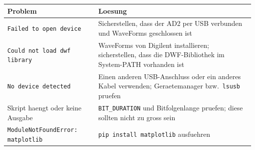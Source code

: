 \begin{center}
\begin{tabular}{p{}p{}}
\toprule
\textbf{Problem} & \textbf{Loesung} \\
\midrule
\texttt{Failed to open device} &
  Sicherstellen, dass der AD2 per USB verbunden und WaveForms geschlossen ist \\
\addlinespace
\texttt{Could not load dwf library} &
  WaveForms von Digilent installieren; sicherstellen, dass die DWF-Bibliothek
  im System-PATH vorhanden ist \\
\addlinespace
\texttt{No device detected} &
  Einen anderen USB-Anschluss oder ein anderes Kabel verwenden;
  Geraetemanager bzw.\ \texttt{lsusb} pruefen \\
\addlinespace
Skript haengt oder keine Ausgabe &
  \texttt{BIT\_DURATION} und Bitfolgenlange pruefen; diese sollten nicht
  zu gross sein \\
\addlinespace
\texttt{ModuleNotFoundError: matplotlib} &
  \texttt{pip install matplotlib} ausfuehren \\
\bottomrule
\end{tabular}
\end{center}
